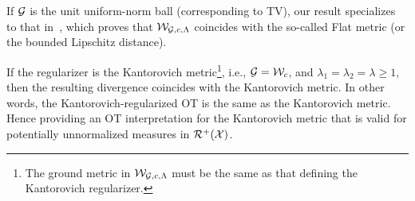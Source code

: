 \begin{remark}
If $\mathcal{G}$ is the unit uniform-norm ball (corresponding to TV), our result specializes to that in~\cite{pic2016}, which proves that $\mathcal{W}_{\mathcal{G}, c, \Lambda}$ coincides with the so-called Flat metric (or the bounded Lipschitz distance).
\end{remark}
\begin{remark}
If the regularizer is the Kantorovich metric\footnote{The ground metric in $\mathcal{W}_{\mathcal{G}, c, \Lambda}$ must be the same as that defining the Kantorovich regularizer.}, i.e., $\mathcal{G}=\mathcal{W}_c$, and $\lambda_1=\lambda_2=\lambda\ge1$, then the resulting divergence coincides with the Kantorovich metric. In other words, the Kantorovich-regularized OT is the same as the Kantorovich metric. Hence providing an OT interpretation for the Kantorovich metric that is valid for potentially unnormalized measures in $\mathcal{R}^+(\mathcal{X})$.%
\end{remark}

